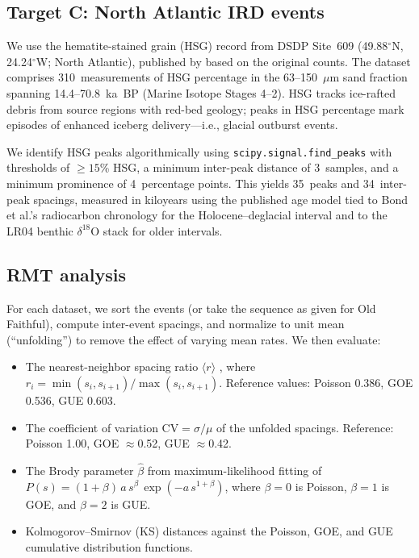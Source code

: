 \documentclass[12pt,a4paper]{article}
\begin{document}
\subsection{Target C: North Atlantic IRD events}

We use the hematite-stained grain (HSG) record from DSDP Site~609 (49.88$^\circ$N, 24.24$^\circ$W; North Atlantic), published by \citet{obrochta2012} based on the original \citet{bond1999} counts. The dataset comprises 310~measurements of HSG percentage in the 63--150~$\mu$m sand fraction spanning 14.4--70.8~ka~BP (Marine Isotope Stages 4--2). HSG tracks ice-rafted debris from source regions with red-bed geology; peaks in HSG percentage mark episodes of enhanced iceberg delivery---i.e., glacial outburst events.

We identify HSG peaks algorithmically using \texttt{scipy.signal.find\_peaks} with thresholds of $\geq15$\% HSG, a minimum inter-peak distance of 3~samples, and a minimum prominence of 4~percentage points. This yields 35~peaks and 34~inter-peak spacings, measured in kiloyears using the published age model tied to Bond et al.'s radiocarbon chronology for the Holocene--deglacial interval and to the LR04 benthic $\delta^{18}$O stack for older intervals.

\subsection{RMT analysis}

For each dataset, we sort the events (or take the sequence as given for Old Faithful), compute inter-event spacings, and normalize to unit mean (``unfolding'') to remove the effect of varying mean rates. We then evaluate:
\begin{itemize}
\item The nearest-neighbor spacing ratio $\langle r\rangle$ \citep{atas2013}, where $r_i=\min(s_i,s_{i+1})/\max(s_i,s_{i+1})$. Reference values: Poisson 0.386, GOE 0.536, GUE 0.603.
\item The coefficient of variation $\mathrm{CV}=\sigma/\mu$ of the unfolded spacings. Reference: Poisson 1.00, GOE $\approx$0.52, GUE $\approx$0.42.
\item The Brody parameter $\hat\beta$ from maximum-likelihood fitting of $P(s)=(1+\beta)\,a\,s^\beta\,\exp(-a\,s^{1+\beta})$, where $\beta=0$ is Poisson, $\beta=1$ is GOE, and $\beta=2$ is GUE.
\item Kolmogorov--Smirnov (KS) distances against the Poisson, GOE, and GUE cumulative distribution functions.
\end{itemize}
\end{document}
